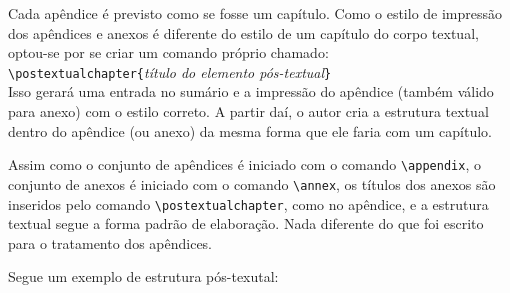 \documentclass[a4paper,12pt,oneside,onecolumn]{article}
\newcommand{\comando}[1]{\texttt{\textbackslash #1}}
\newcommand{\param}[1]{\texttt{\{}\textsl{#1}\texttt{\}}}
\begin{document}
\noindent Cada apêndice é previsto como se fosse um capítulo. Como o estilo de impressão dos apêndices e anexos é diferente do estilo de um capítulo do corpo textual, optou-se por se criar um comando próprio chamado:\\

\comando{postextualchapter}\param{título do elemento pós-textual}\\

\noindent Isso gerará uma entrada no sumário e a impressão do apêndice (também válido para anexo) com o estilo correto. A partir daí, o autor cria a estrutura textual dentro do apêndice (ou anexo) da mesma forma que ele faria com um capítulo.

Assim como o conjunto de apêndices é iniciado com o comando \comando{appendix}, o conjunto de anexos é iniciado com o comando \comando{annex}, os títulos dos anexos são inseridos pelo comando \comando{postextualchapter}, como no apêndice, e a estrutura textual segue a forma padrão de elaboração. Nada diferente do que foi escrito para o tratamento dos apêndices.

Segue um exemplo de estrutura pós-texutal:\\
\end{document}
